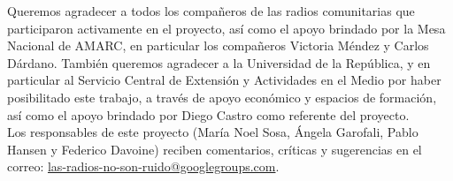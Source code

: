 Queremos agradecer a todos los compañeros de las radios comunitarias que participaron activamente en el proyecto, así como el apoyo brindado por la Mesa Nacional de AMARC, en particular los compañeros Victoria Méndez y Carlos Dárdano. También queremos agradecer a la Universidad de la República, y en particular al Servicio Central de Extensión y Actividades en el Medio por haber posibilitado este trabajo, a través de apoyo económico y espacios de formación, así como el apoyo brindado por Diego Castro como referente del proyecto.\\

Los responsables de este proyecto (María Noel Sosa, Ángela Garofali, Pablo Hansen y Federico Davoine) reciben comentarios, críticas y sugerencias en el correo: \href{mailto:las-radios-no-son-ruido@googlegroups.com}{las-radios-no-son-ruido@googlegroups.com}.